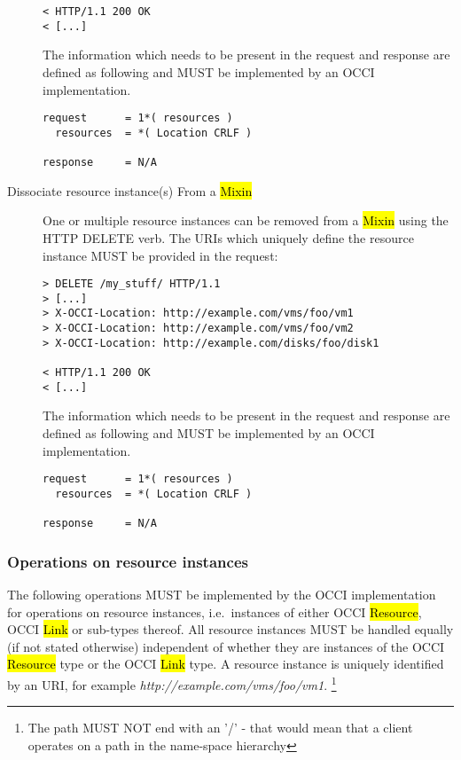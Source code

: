 \documentclass[10pt,a4paper]{article}
\begin{document}
\begin{description}
\begin{verbatim}
< HTTP/1.1 200 OK
< [...]
\end{verbatim}

    The information which needs to be present in the request and
    response are defined as following and MUST be implemented by an
    OCCI implementation.

\begin{verbatim}
request      = 1*( resources )
  resources  = *( Location CRLF )

response     = N/A
\end{verbatim}

  \item[Dissociate resource instance(s) From a \hl{Mixin}] One or
    multiple resource instances can be removed from a \hl{Mixin} using
    the HTTP DELETE verb. The URIs which uniquely define the resource
    instance MUST be provided in the request:

\begin{verbatim}
> DELETE /my_stuff/ HTTP/1.1
> [...]
> X-OCCI-Location: http://example.com/vms/foo/vm1
> X-OCCI-Location: http://example.com/vms/foo/vm2
> X-OCCI-Location: http://example.com/disks/foo/disk1

< HTTP/1.1 200 OK
< [...]
\end{verbatim}

    The information which needs to be present in the request and
    response are defined as following and MUST be implemented by an
    OCCI implementation.

\begin{verbatim}
request      = 1*( resources )
  resources  = *( Location CRLF )

response     = N/A
\end{verbatim}

\end{description}

\subsubsection{Operations on resource instances}
\label{sec:ops_on_instances}
The following operations MUST be implemented by the OCCI
implementation for operations on resource instances, i.e.~instances of
either OCCI \hl{Resource}, OCCI \hl{Link} or sub-types thereof. All
resource instances MUST be handled equally (if not stated otherwise)
independent of whether they are instances of the OCCI \hl{Resource}
type or the OCCI \hl{Link} type. A resource instance is uniquely
identified by an URI, for example
\emph{http://example.com/vms/foo/vm1}. \footnote{The path MUST NOT end
  with an '/' - that would mean that a client operates on a path in
  the name-space hierarchy}
\end{document}
